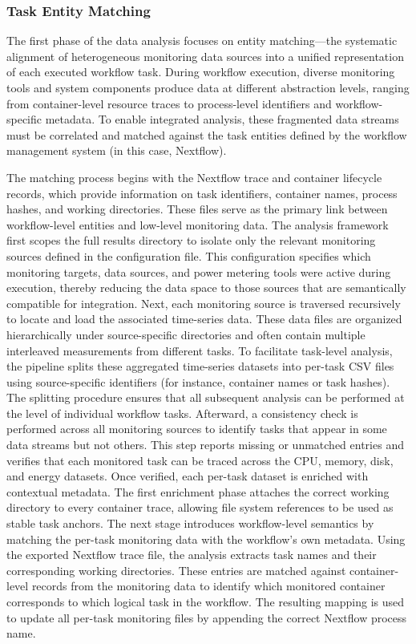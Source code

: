 \subsubsection{Task Entity Matching}
\label{sec:task_entity_matching}
The first phase of the data analysis focuses on entity matching—the systematic alignment of heterogeneous monitoring data sources into a unified representation of each executed workflow task. During workflow execution, diverse monitoring tools and system components produce data at different abstraction levels, ranging from container-level resource traces to process-level identifiers and workflow-specific metadata. To enable integrated analysis, these fragmented data streams must be correlated and matched against the task entities defined by the workflow management system (in this case, Nextflow).

The matching process begins with the Nextflow trace and container lifecycle records, which provide information on task identifiers, container names, process hashes, and working directories. These files serve as the primary link between workflow-level entities and low-level monitoring data. The analysis framework first scopes the full results directory to isolate only the relevant monitoring sources defined in the configuration file. This configuration specifies which monitoring targets, data sources, and power metering tools were active during execution, thereby reducing the data space to those sources that are semantically compatible for integration.
Next, each monitoring source is traversed recursively to locate and load the associated time-series data. These data files are organized hierarchically under source-specific directories and often contain multiple interleaved measurements from different tasks. To facilitate task-level analysis, the pipeline splits these aggregated time-series datasets into per-task CSV files using source-specific identifiers (for instance, container names or task hashes). The splitting procedure ensures that all subsequent analysis can be performed at the level of individual workflow tasks.
Afterward, a consistency check is performed across all monitoring sources to identify tasks that appear in some data streams but not others. This step reports missing or unmatched entries and verifies that each monitored task can be traced across the CPU, memory, disk, and energy datasets. Once verified, each per-task dataset is enriched with contextual metadata. The first enrichment phase attaches the correct working directory to every container trace, allowing file system references to be used as stable task anchors.
The next stage introduces workflow-level semantics by matching the per-task monitoring data with the workflow’s own metadata. Using the exported Nextflow trace file, the analysis extracts task names and their corresponding working directories. These entries are matched against container-level records from the monitoring data to identify which monitored container corresponds to which logical task in the workflow. The resulting mapping is used to update all per-task monitoring files by appending the correct Nextflow process name.

